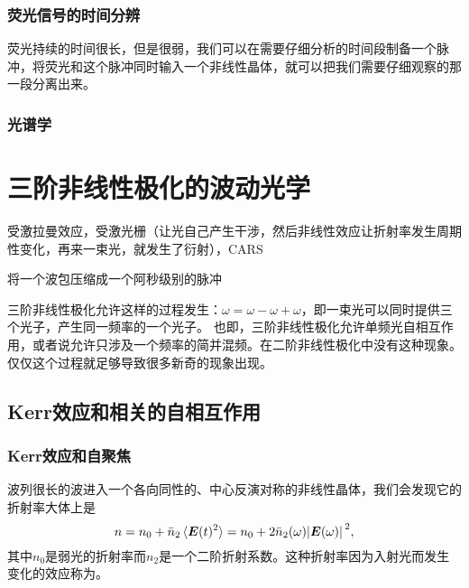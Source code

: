 \subsubsection{荧光信号的时间分辨}

荧光持续的时间很长，但是很弱，我们可以在需要仔细分析的时间段制备一个脉冲，将荧光和这个脉冲同时输入一个非线性晶体，就可以把我们需要仔细观察的那一段分离出来。

\subsubsection{光谱学}

\section{三阶非线性极化的波动光学}\label{sec:chi-3-wave}

受激拉曼效应，受激光栅（让光自己产生干涉，然后非线性效应让折射率发生周期性变化，再来一束光，就发生了衍射），CARS

将一个波包压缩成一个阿秒级别的脉冲

三阶非线性极化允许这样的过程发生：$\omega = \omega - \omega + \omega$，即一束光可以同时提供三个光子，产生同一频率的一个光子。
也即，三阶非线性极化允许单频光自相互作用，或者说允许只涉及一个频率的简并混频。在二阶非线性极化中没有这种现象。
仅仅这个过程就足够导致很多新奇的现象出现。

\subsection{Kerr效应和相关的自相互作用}

\subsubsection{Kerr效应和自聚焦}

波列很长的波进入一个各向同性的、中心反演对称的非线性晶体，我们会发现它的折射率大体上是
\begin{equation}
    n = n_0 + \bar{n}_2 \expval*{\vb*{E}(t)^2} = n_0 + 2 \bar{n}_2(\omega) \abs*{\vb*{E}(\omega)}^2,
    \label{eq:ref-index-change}
\end{equation}
其中$n_0$是弱光的折射率而$n_2$是一个二阶折射系数。这种折射率因为入射光而发生变化的效应称为。

